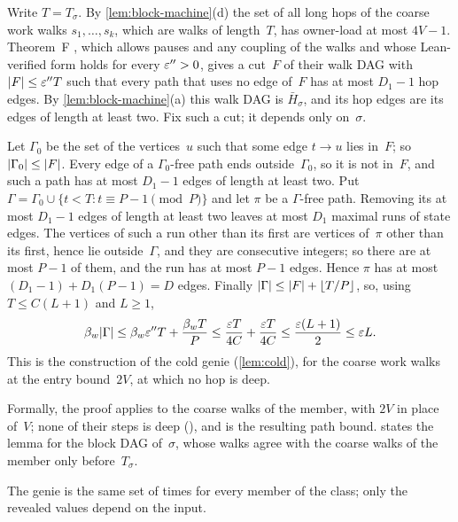 \begin{outline}
Write $T=T_\sigma$. By \cref{lem:block-machine}(d) the set of all long hops of the coarse work walks $s_1,\dots,s_k$,
which are walks of length~$T$, has owner-load at most $4V-1$. Theorem~F \cite[Theorem~3.6]{BoundedNesting2026}, which
allows pauses and any coupling of the walks and whose Lean-verified form holds for every $\varepsilon''>0$, gives a cut~$F$ of
their walk DAG with $\lvert F \rvert\le\varepsilon''T$ such that every path that uses no edge of~$F$ has at most $D_1-1$ hop edges. By
\cref{lem:block-machine}(a) this walk DAG is $\bar H_\sigma$, and its hop edges are its edges of length at least two.
Fix such a cut; it depends only on~$\sigma$.

Let $\Gamma_0$ be the set of the vertices~$u$ such that some edge $t\to u$ lies in~$F$; so $\lvert \Gamma_0 \rvert\le\lvert F \rvert$.
Every edge of a $\Gamma_0$-free path ends outside~$\Gamma_0$, so it is not in~$F$, and such a path has at most $D_1-1$
edges of length at least two. Put $\Gamma=\Gamma_0\cup\{t<T:t\equiv P-1\pmod P\}$ and let $\pi$ be a $\Gamma$-free path.
Removing its at most $D_1-1$ edges of length at least two leaves at most $D_1$ maximal runs of state edges. The vertices
of such a run other than its first are vertices of~$\pi$ other than its first, hence lie outside~$\Gamma$, and they are
consecutive integers; so there are at most $P-1$ of them, and the run has at most $P-1$ edges. Hence $\pi$ has at most
$(D_1-1)+D_1(P-1)=D$ edges. Finally $\lvert \Gamma \rvert\le\lvert F \rvert+\lfloor T/P\rfloor$, so, using $T\le C(L+1)$ and $L\ge1$,
\[
  \beta_w\lvert \Gamma \rvert\le\beta_w\varepsilon''T+\frac{\beta_wT}P\le\frac{\varepsilon T}{4C}+\frac{\varepsilon T}{4C}\le\frac{\varepsilon(L+1)}2\le\varepsilon L.
\]
This is the construction of the cold genie (\cref{lem:cold}), for the coarse work walks at the entry bound~$2V$, at
which no hop is deep.

Formally, the proof applies  to the coarse walks of the member, with $2V$ in place of~$V$;
none of their steps is deep (), and  is the
resulting path bound.  states the lemma for the block DAG of~$\sigma$, whose walks agree
with the coarse walks of the member only before~$T_\sigma$.
\end{outline}

The genie is the same set of times for every member of the class; only the revealed values depend on the input.


